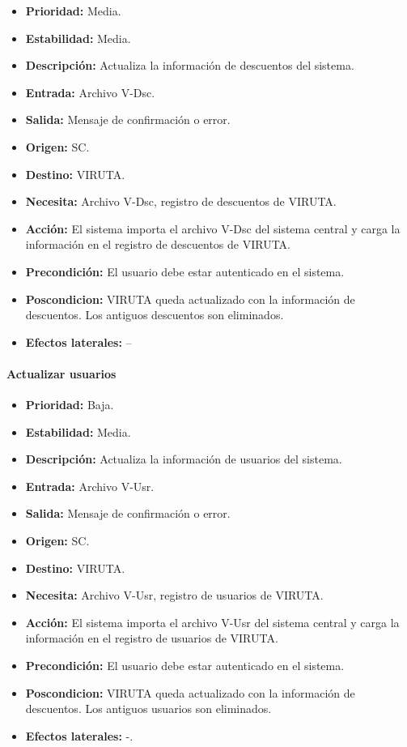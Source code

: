 \begin{itemize}
\item \textbf{Prioridad:} Media.
\item \textbf{Estabilidad:} Media.
\item \textbf{Descripción:} Actualiza la información de descuentos del sistema.
\item \textbf{Entrada:} Archivo V-Dsc.
\item \textbf{Salida:} Mensaje de confirmación o error.
\item \textbf{Origen:} SC.
\item \textbf{Destino:} VIRUTA.
\item \textbf{Necesita:} Archivo V-Dsc, registro de descuentos de VIRUTA.
\item \textbf{Acción:} El sistema importa el archivo V-Dsc del sistema central y carga la información en el registro de descuentos de VIRUTA.
\item \textbf{Precondición:} El usuario debe estar autenticado en el sistema.
\item \textbf{Poscondicion:} VIRUTA queda actualizado con la información de descuentos. Los antiguos descuentos son eliminados.
\item \textbf{Efectos laterales:} --
\end{itemize}

\paragraph{Actualizar usuarios}

\begin{itemize}
\item \textbf{Prioridad:} Baja.
\item \textbf{Estabilidad:} Media.
\item \textbf{Descripción:} Actualiza la información de usuarios del sistema.
\item \textbf{Entrada:} Archivo V-Usr.
\item \textbf{Salida:} Mensaje de confirmación o error.
\item \textbf{Origen:} SC.
\item \textbf{Destino:} VIRUTA.
\item \textbf{Necesita:} Archivo V-Usr, registro de usuarios de VIRUTA.
\item \textbf{Acción:} El sistema importa el archivo V-Usr del sistema central y carga la información en el registro de usuarios de VIRUTA.
\item \textbf{Precondición:} El usuario debe estar autenticado en el sistema.
\item \textbf{Poscondicion:} VIRUTA queda actualizado con la información de descuentos. Los antiguos usuarios son eliminados.
\item \textbf{Efectos laterales:} -.

\end{itemize}

